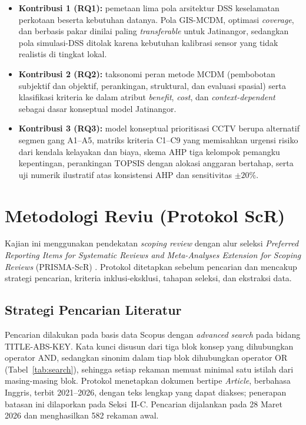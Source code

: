 \documentclass[10pt,twocolumn,a4paper]{article}
\begin{document}
\begin{itemize}
\item \textbf{Kontribusi 1 (RQ1):} pemetaan lima pola arsitektur DSS keselamatan perkotaan beserta kebutuhan datanya. Pola GIS-MCDM, optimasi \textit{coverage}, dan berbasis pakar dinilai paling \textit{transferable} untuk Jatinangor, sedangkan pola simulasi-DSS ditolak karena kebutuhan kalibrasi sensor yang tidak realistis di tingkat lokal.
\item \textbf{Kontribusi 2 (RQ2):} taksonomi peran metode MCDM (pembobotan subjektif dan objektif, perankingan, struktural, dan evaluasi spasial) serta klasifikasi kriteria ke dalam atribut \textit{benefit}, \textit{cost}, dan \textit{context-dependent} sebagai dasar konseptual model Jatinangor.
\item \textbf{Kontribusi 3 (RQ3):} model konseptual prioritisasi CCTV berupa alternatif segmen gang A1--A5, matriks kriteria C1--C9 yang memisahkan urgensi risiko dari kendala kelayakan dan biaya, skema AHP tiga kelompok pemangku kepentingan, perankingan TOPSIS dengan alokasi anggaran bertahap, serta uji numerik ilustratif atas konsistensi AHP dan sensitivitas $\pm 20\%$.
\end{itemize}

\section{Metodologi Reviu (Protokol ScR)}
Kajian ini menggunakan pendekatan \textit{scoping review} dengan alur seleksi \textit{Preferred Reporting Items for Systematic Reviews and Meta-Analyses Extension for Scoping Reviews} (PRISMA-ScR) \cite{tricco}. Protokol ditetapkan sebelum pencarian dan mencakup strategi pencarian, kriteria inklusi-eksklusi, tahapan seleksi, dan ekstraksi data.

\subsection{Strategi Pencarian Literatur}
Pencarian dilakukan pada basis data Scopus dengan \textit{advanced search} pada bidang TITLE-ABS-KEY. Kata kunci disusun dari tiga blok konsep yang dihubungkan operator AND, sedangkan sinonim dalam tiap blok dihubungkan operator OR (Tabel~\ref{tab:search}), sehingga setiap rekaman memuat minimal satu istilah dari masing-masing blok. Protokol menetapkan dokumen bertipe \textit{Article}, berbahasa Inggris, terbit 2021--2026, dengan teks lengkap yang dapat diakses; penerapan batasan ini dilaporkan pada Seksi~II-C. Pencarian dijalankan pada 28 Maret 2026 dan menghasilkan 582 rekaman awal.
\end{document}
